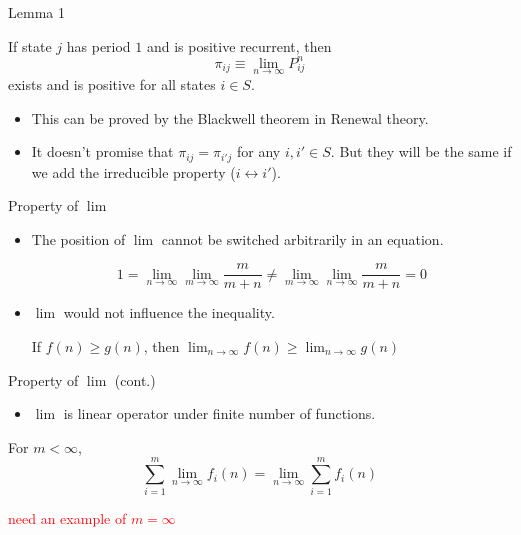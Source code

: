 \documentclass[mathserif]{beamer}
\begin{document}
\begin{frame}{Lemma 1}
	\begin{lemma}
		If state $j$ has period $1$ and is positive recurrent, then
		\[
		\pi_{ij} \equiv \lim_{n \to \infty} P^n_{ij}
		\]
		exists and is positive for all states $i \in S$.
	\end{lemma}
	\begin{itemize}
		\item This can be proved by the Blackwell theorem in Renewal theory.
		\item It doesn't promise that $\pi_{ij} = \pi_{i'j}$ for any $i,i' \in S$.
			But they will be the same if we add the irreducible property ($i \leftrightarrow i'$).
	\end{itemize}
\end{frame}

\begin{frame}{Property of $\lim$}
	\begin{itemize}
		\item The position of $\lim$ cannot be switched arbitrarily in an equation.
			\begin{example}
				\[
				1 = \lim_{n \to \infty}\lim_{m \to \infty} \frac{m}{m+n} \neq
				\lim_{m \to \infty}\lim_{n \to \infty} \frac{m}{m+n} = 0
				\]
			\end{example}
		\item $\lim$ would not influence the inequality.
			\begin{example}
				\begin{center}
					If $f(n) \geq g(n)$, then
					$\lim_{n \to \infty} f(n) \geq \lim_{n \to \infty} g(n)$
				\end{center}
			\end{example}
	\end{itemize}
\end{frame}

\begin{frame}{Property of $\lim$ (cont.)}
	\begin{itemize}
		\item $\lim$ is linear operator under finite number of functions.
	\end{itemize}
	\begin{example}
		For $m < \infty$,
		\[
		\sum_{i=1}^m \lim_{n \to \infty} f_i(n) = \lim_{n \to \infty} \sum_{i=1}^m f_i(n)
		\]
	\end{example}
	\textcolor{red}{need an example of $m = \infty$}
\end{frame}
\end{document}
